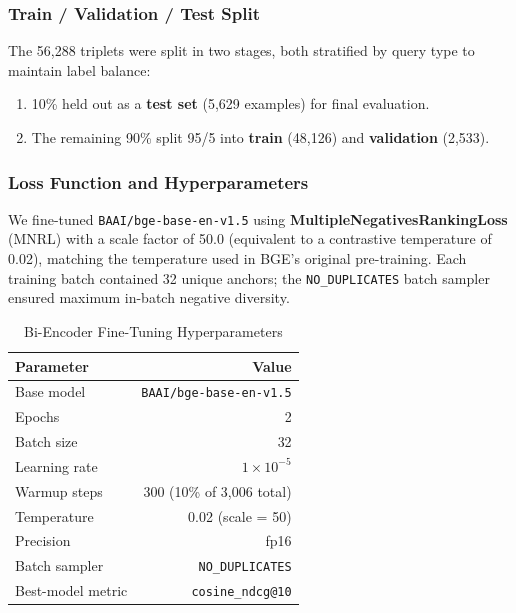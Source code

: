 \documentclass[10pt, letterpaper]{article}
\begin{document}
\subsubsection{Train / Validation / Test Split}

The 56,288 triplets were split in two stages, both stratified by query type to maintain
label balance:

\begin{enumerate}[noitemsep, topsep=4pt]
    \item 10\% held out as a \textbf{test set} (5,629 examples) for final evaluation.
    \item The remaining 90\% split 95/5 into \textbf{train} (48,126) and \textbf{validation}
          (2,533).
\end{enumerate}

\subsubsection{Loss Function and Hyperparameters}

We fine-tuned \texttt{BAAI/bge-base-en-v1.5} using \textbf{MultipleNegativesRankingLoss}
(MNRL) with a scale factor of 50.0 (equivalent to a contrastive temperature of 0.02),
matching the temperature used in BGE's original pre-training. Each training batch
contained 32 unique anchors; the \texttt{NO\_DUPLICATES} batch sampler ensured maximum
in-batch negative diversity.

\begin{table}[h]
\centering
\caption{Bi-Encoder Fine-Tuning Hyperparameters}
\label{tab:biencoder-hp}
\begin{tabular}{@{}lr@{}}
\toprule
\textbf{Parameter} & \textbf{Value} \\
\midrule
Base model              & \texttt{BAAI/bge-base-en-v1.5} \\
Epochs                  & 2 \\
Batch size              & 32 \\
Learning rate           & $1 \times 10^{-5}$ \\
Warmup steps            & 300 (10\% of 3,006 total) \\
Temperature             & 0.02 (scale = 50) \\
Precision               & fp16 \\
Batch sampler           & \texttt{NO\_DUPLICATES} \\
Best-model metric       & \texttt{cosine\_ndcg@10} \\
\bottomrule
\end{tabular}
\end{table}
\end{document}
